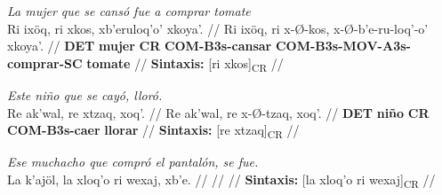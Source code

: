 \documentclass{article}%
\begin{document}
%
\par\medskip%
\ex
\textit{La mujer que se cansó fue a comprar tomate} \\
\begingl
\gla Ri ixöq, ri xkos, xb'eruloq'o' xkoya'. //
\glb Ri ixöq, ri x-Ø-kos, x-Ø-b'e-ru-loq'-o' xkoya'. //
\glc \textbf{DET} \textbf{mujer} \textbf{CR} \textbf{COM-}\textbf{B3s-}\textbf{cansar} \textbf{COM-}\textbf{B3s-}\textbf{MOV-}\textbf{A3s-}\textbf{comprar-}\textbf{SC} \textbf{tomate} //
\glft \textbf{Sintaxis:} [ri xkos]\textsubscript{CR} //
\endgl
\xe
%
\medskip%
\par\medskip%
\ex
\textit{Este niño que se cayó, lloró.} \\
\begingl
\gla Re ak'wal, re xtzaq, xoq'. //
\glb Re ak'wal, re x-Ø-tzaq, xoq'. //
\glc \textbf{DET} \textbf{niño} \textbf{CR} \textbf{COM-}\textbf{B3s-}\textbf{caer} \textbf{llorar} //
\glft \textbf{Sintaxis:} [re xtzaq]\textsubscript{CR} //
\endgl
\xe
%
\medskip%
\par\medskip%
\ex
\textit{Ese muchacho que compró el pantalón, se fue.} \\
\begingl
\gla La k'ajöl, la xloq'o ri wexaj, xb'e. //
\glb  //
\glc  //
\glft \textbf{Sintaxis:} [la xloq'o ri wexaj]\textsubscript{CR} //
\endgl
\xe
%
\medskip

%
\end{document}
